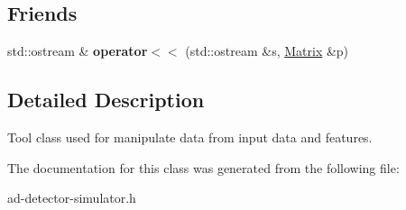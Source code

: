 \subsection*{Friends}
\begin{DoxyCompactItemize}
\item 
\hypertarget{classns3_1_1Matrix_a5ac1143f9f2df2f556d21e1f16891b52}{}std\+::ostream \& {\bfseries operator$<$$<$} (std\+::ostream \&s, \hyperlink{classns3_1_1Matrix}{Matrix} \&p)\label{classns3_1_1Matrix_a5ac1143f9f2df2f556d21e1f16891b52}

\end{DoxyCompactItemize}


\subsection{Detailed Description}
Tool class used for manipulate data from input data and features. 

The documentation for this class was generated from the following file\+:\begin{DoxyCompactItemize}
\item 
ad-\/detector-\/simulator.\+h\end{DoxyCompactItemize}
